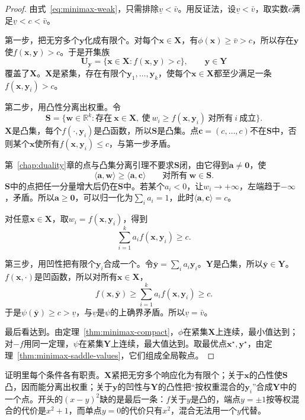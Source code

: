 \begin{proof}
由式~\eqref{eq:minimax-weak}，只需排除$\underline{v}<\bar{v}$。用反证法，设$\underline{v}<\bar{v}$，取实数$c$满足$\underline{v}<c<\bar{v}$。

第一步，把无穷多个$\bm{y}$化成有限个。对每个$\bm{x}\in\bm{X}$，有$\phi(\bm{x})\geq\bar{v}>c$，所以存在$\bm{y}$使$f(\bm{x},\bm{y})>c$。于是开集族
\[
 \bm{U}_{\bm{y}}=\{\bm{x}\in\bm{X}:f(\bm{x},\bm{y})>c\},\qquad\bm{y}\in\bm{Y}
\]
覆盖了$\bm{X}$。$\bm{X}$是紧集，存在有限个$\bm{y}_1,\ldots,\bm{y}_k$，使每个$\bm{x}\in\bm{X}$都至少满足一条$f(\bm{x},\bm{y}_i)>c$。

第二步，用凸性分离出权重。令
\[
 \bm{S}=\bigl\{\bm{w}\in\mathbb{R}^k:\text{存在}\ \bm{x}\in\bm{X},\ \text{使}\ w_i\geq f(\bm{x},\bm{y}_i)\ \text{对所有}\ i\ \text{成立}\bigr\}.
\]
$\bm{X}$是凸集，每个$f(\cdot,\bm{y}_i)$是凸函数，所以$\bm{S}$是凸集。点$\bm{c}=(c,\ldots,c)$不在$\bm{S}$中，否则某个$\bm{x}$使所有$f(\bm{x},\bm{y}_i)\leq c$，与第一步矛盾。

第~\ref{chap:duality}章的点与凸集分离引理不要求$\bm{S}$闭，由它得到$\bm{a}\neq\bm{0}$，使
\[
 \langle\bm{a},\bm{w}\rangle\geq\langle\bm{a},\bm{c}\rangle\qquad\text{对所有}\ \bm{w}\in\bm{S}.
\]
$\bm{S}$中的点把任一分量增大后仍在$\bm{S}$中。若某个$a_i<0$，让$w_i\to+\infty$，左端趋于$-\infty$，矛盾。所以$\bm{a}\geq\bm{0}$，可以归一化为$\sum_ia_i=1$，此时$\langle\bm{a},\bm{c}\rangle=c$。

对任意$\bm{x}\in\bm{X}$，取$w_i=f(\bm{x},\bm{y}_i)$，得到
\[
 \sum_{i=1}^ka_if(\bm{x},\bm{y}_i)\geq c.
\]

第三步，用凹性把有限个$\bm{y}_i$合成一个。令$\bar{\bm{y}}=\sum_ia_i\bm{y}_i$。$\bm{Y}$是凸集，所以$\bar{\bm{y}}\in\bm{Y}$。$f(\bm{x},\cdot)$是凹函数，所以对所有$\bm{x}\in\bm{X}$，
\[
 f(\bm{x},\bar{\bm{y}})\geq\sum_{i=1}^ka_if(\bm{x},\bm{y}_i)\geq c.
\]
于是$\psi(\bar{\bm{y}})\geq c>\underline{v}$，与$\underline{v}$是$\psi$的上确界矛盾。所以$\underline{v}=\bar{v}$。

最后看达到。由定理~\ref{thm:minimax-compact}，$\phi$在紧集$\bm{X}$上连续，最小值达到；对$-f$用同一定理，$\psi$在紧集$\bm{Y}$上连续，最大值达到。取最优点$\bm{x}^\star,\bm{y}^\star$，由定理~\ref{thm:minimax-saddle-values}，它们组成全局鞍点。
\end{proof}

证明里每个条件各有职责。$\bm{X}$紧把无穷多个响应化为有限个；关于$\bm{x}$的凸性使$\bm{S}$凸，因而能分离出权重；关于$\bm{y}$的凹性与$\bm{Y}$的凸性把“按权重混合的$\bm{y}_i$”合成$\bm{Y}$中的一个点。开头的$(x-y)^2$缺的是最后一条：$f$关于$y$是凸的，端点$y=\pm1$按等权混合的代价是$x^2+1$，而单点$y=0$的代价只有$x^2$，混合无法用一个$y$代替。

